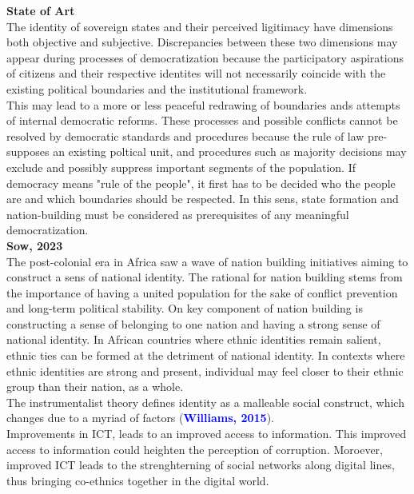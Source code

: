 \documentclass[11pt]{article}
\theoremstyle{plain}
\theoremstyle{plain}
\begin{document}
\textbf{State of Art}\\

The identity of sovereign states and their perceived ligitimacy have dimensions both objective and subjective.
Discrepancies between these two dimensions may appear during processes of democratization because the participatory aspirations of citizens
 and their respective identites will not necessarily coincide with the existing political boundaries and the institutional framework.\\
 
This may lead to a more or less peaceful redrawing of boundaries ands attempts of internal democratic reforms.
These processes and possible conflicts cannot be resolved by democratic standards and procedures because the rule of law pre-supposes an existing poltical unit, and procedures such as majority decisions may exclude and possibly suppress important segments of the population.
If democracy means "rule of the people", it first has to be decided who the people are and which boundaries should be respected.
In this sens, state formation and nation-building must be considered as prerequisites of any meaningful democratization.\\


\textbf{Sow, 2023}\\

The post-colonial era in Africa saw a wave of nation building initiatives aiming to construct a sens of national identity.
The rational for nation building stems from the importance of having a united population for the sake of conflict prevention and long-term political stability.
On key component of nation building is constructing a sense of belonging to one nation and having a strong sense of national identity.
In African countries where ethnic identities remain salient, ethnic ties can be formed at the detriment of national identity. In contexts where ethnic identities are strong and present, individual may feel closer to their ethnic group than their nation, as a whole.\\

The instrumentalist theory defines identity as a malleable social construct, which changes due to a myriad of factors (\textcolor{blue}{\textbf{Williams, 2015}}).\\

Improvements in ICT, leads to an improved access to information.
This improved access to information could heighten the perception of corruption.
Moroever, improved ICT leads to the strenghterning of social networks along digital lines, thus bringing co-ethnics together in the digital world.\\
\end{document}
